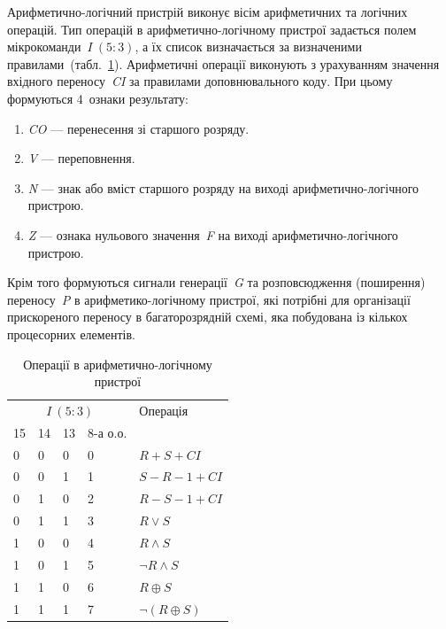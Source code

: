 \documentclass[a4paper,oneside,DIV=12,12pt,headings=normal]{scrartcl}
\newcommand{\schel}[1]{\textit{#1}}
\newcommand{\addrinterval}[2]{(#1{:}#2)}
\begin{document}
				Арифметично-логічний пристрій виконує вісім арифметичних та логічних операцій. Тип операцій в арифметично-логічному пристрої задається полем мікрокоманди~$\schel{I}~\addrinterval{5}{3}$, а їх список визначається за визначеними правилами~(табл.~\ref{tab:alu-operations}). Арифметичні операції виконують з урахуванням значення вхідного переносу~\schel{CI} за правилами доповнювального коду. При цьому формуються 4~ознаки результату:
				\begin{enumerate}
					\item \schel{CO} — перенесення зі старшого розряду.
					\item \schel{V} — переповнення.
					\item \schel{N} — знак або вміст старшого розряду на виході арифметично-логічного пристрою.
					\item \schel{Z} — ознака нульового значення~\schel{F} на виході арифметично-логічного пристрою.
				\end{enumerate}
				Крім того формуються сигнали генерації~\schel{G} та розповсюдження (поширення) переносу~\schel{P} в арифметико-логічному пристрої, які потрібні для організації прискореного переносу в багаторозрядній схемі, яка побудована із кількох процесорних елементів.
				\begin{table}[!htbp]
					\centering
					\begin{tabular}{*{5}{l}}
						\toprule
							\multicolumn{4}{c}{$\schel{I}~\addrinterval{5}{3}$} & Операція\\
							\cmidrule(lr){1-4}
							15 & 14 & 13 & 8-а о.о. &  \\
						\midrule
							0  & 0  & 0  & 0        & $R + S + CI$ \\
							0  & 0  & 1  & 1        & $S - R - 1 + CI$ \\
							0  & 1  & 0  & 2        & $R - S - 1 + CI$ \\
							0  & 1  & 1  & 3        & $R \lor S$ \\
							1  & 0  & 0  & 4        & $R \land S$ \\
							1  & 0  & 1  & 5        & $\neg R \land S$ \\
							1  & 1  & 0  & 6        & $R \oplus S$ \\
							1  & 1  & 1  & 7        & $\neg ( R \oplus S)$\\
						\bottomrule
					\end{tabular}
					\caption{Операції в арифметично-логічному пристрої}
					\label{tab:alu-operations}
				\end{table}
\end{document}
